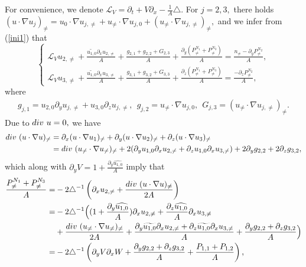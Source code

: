\documentclass[12pt, reqno]{amsart}
\numberwithin{equation}{section}
\begin{document}
	
	For convenience, we denote $\mathcal{L}_V=\partial_t+V\partial_x -\frac{1}{A}\triangle.$
	For $j=2,3,$ there holds
	$(u\cdot\nabla u_{j})_{\neq}=u_0\cdot\nabla u_{j,\neq}
	+u_{\neq}\cdot\nabla u_{j,0}+(u_{\neq}\cdot\nabla u_{j,\neq})_{\neq},$
	and we infer from (\ref{ini1}) that   
	\begin{equation}\label{ini_5}
		\left\{
		\begin{array}{lr}
			\mathcal{L}_Vu_{2,\neq}
			+\frac{\widetilde{u_{1,0}}\partial_xu_{2,\neq}}{A}
			+\frac{g_{2,1}+g_{2,2}+{G_{2,3}}}{A}
			+\frac{\partial_y(P^{N_1}_{\neq}+P^{N_3}_{\neq})}{A}=\frac{n_{\neq}-\partial_y P^{N_2}_{\neq}}{A},\\
			\mathcal{L}_Vu_{3,\neq}
			+\frac{\widetilde{u_{1,0}}\partial_xu_{3,\neq}}{A}
			+\frac{g_{3,1}+g_{3,2}+{G_{3,3}}}{A}
			+\frac{\partial_z(P^{N_1}_{\neq}+P^{N_3}_{\neq})}{A}=
			\frac{-\partial_z P^{N_2}_{\neq}}{A},
		\end{array}
		\right.
	\end{equation}
	where 
	\begin{equation*}
		\begin{aligned}
			g_{j,1}={u_{2,0}\partial_yu_{j,\neq}+u_{3,0}\partial_zu_{j,\neq}},
			~~g_{j,2}={u_{\neq}\cdot\nabla u_{j,0}},
			~~G_{j,3}={(u_{\neq}\cdot\nabla u_{j,\neq})_{\neq}}.
		\end{aligned}
	\end{equation*}
	Due to ${\rm div}~u=0,$ we have
	\begin{equation*}
		\begin{aligned}
			{\rm div}~(u\cdot\nabla u)_{\neq}
			&	=\partial_x(u\cdot\nabla u_1)_{\neq}
			+\partial_y(u\cdot\nabla u_2)_{\neq}
			+\partial_z(u\cdot\nabla u_3)_{\neq}\\
			&={\rm div}~(u_{\neq}\cdot\nabla u_{\neq})_{\neq}+
			2(\partial_yu_{1,0}\partial_xu_{2,\neq}+
			\partial_zu_{1,0}\partial_xu_{3,\neq})+2\partial_yg_{2,2}
			+2\partial_zg_{3,2},
		\end{aligned}
	\end{equation*}
	which along with $\partial_yV=1+\frac{\partial_y\widehat{ u_{1,0}}}{A}$ imply that 
	\begin{equation*}
		\begin{aligned}
			\frac{P^{N_1}_{\neq}+P^{N_3}_{\neq}}{A}
			=&-2\triangle^{-1}\left(\partial_xu_{2,\neq}+
			\frac{{\rm div}~(u\cdot\nabla u)_{\neq}}{2A}\right)\\
			=&-2\triangle^{-1}\Big((1+\frac{\partial_y\widehat{ u_{1,0}}}{A})
			\partial_xu_{2,\neq}
			+\frac{\partial_z\widehat{ u_{1,0}}}{A}
			\partial_xu_{3,\neq}\\
			&+\frac{{\rm div}~(u_{\neq}\cdot\nabla u_{\neq})_{\neq}}{2A}
			+\frac{\partial_y\widetilde{ u_{1,0}}\partial_xu_{2,\neq}+
				\partial_z\widetilde{u_{1,0}}\partial_xu_{3,\neq}}{A}
			+\frac{\partial_yg_{2,2}+\partial_zg_{3,2}}{A}\Big)\\
			=&-2\triangle^{-1}\left(\partial_yV\partial_xW
			+\frac{\partial_yg_{2,2}+\partial_zg_{3,2}}{A}
			+\frac{P_{1,1}+P_{1,2}}{A}\right),
		\end{aligned}
	\end{equation*}
\end{document}
